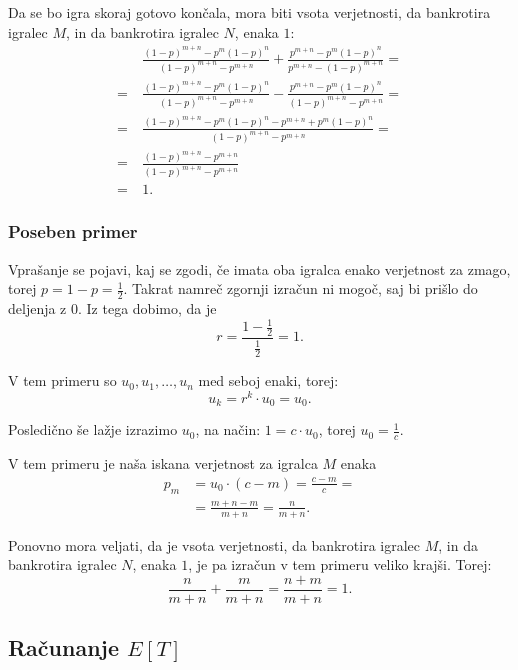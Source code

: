 \documentclass[12pt, a4paper]{article}
\begin{document}
Da se bo igra skoraj gotovo končala, mora biti vsota verjetnosti, da bankrotira igralec $M$, in da bankrotira igralec $N$, enaka $1$:
\begin{equation*}
\begin{split}
&~\frac{(1-p)^{m+n}-p^m (1-p)^n}{(1-p)^{m+n}-p^{m+n}}+\frac{p^{m+n}-p^m
   (1-p)^n}{p^{m+n}-(1-p)^{m+n}} =\\
= &~\frac{(1-p)^{m+n}-p^m (1-p)^n}{(1-p)^{m+n}-p^{m+n}}-\frac{p^{m+n}-p^m
   (1-p)^n}{(1-p)^{m+n}-p^{m+n}} =\\
= &~\frac{(1-p)^{m+n}-p^m (1-p)^n-p^{m+n}+p^m
   (1-p)^n}{(1-p)^{m+n}-p^{m+n}} =\\
= &~\frac{(1-p)^{m+n}-p^{m+n}}{(1-p)^{m+n}-p^{m+n}} \\
= &~1.
\end{split} 
\end{equation*}


\subsubsection{Poseben primer}
\label{Poseben primer za  r = 1}
Vprašanje se pojavi, kaj se zgodi, če imata oba igralca enako verjetnost za zmago, torej $p = 1 - p = \frac{1}{2}$. Takrat namreč zgornji izračun ni mogoč, saj bi prišlo do deljenja z $0$. Iz tega dobimo, da je 
$$r = \frac{1 - \frac{1}{2}}{\frac{1}{2}} = 1.$$

V tem primeru so $u_0, u_1, \dotso, u_n$ med seboj enaki, torej:
$$u_k = r^k \cdot u_0 = u_0.$$

Posledično še lažje izrazimo $u_0$, na način:
$1 = c\cdot u_0$, torej $u_0 = \frac{1}{c}.$

V tem primeru je naša iskana verjetnost za igralca $M$ enaka
\begin{equation*}
\begin{split}
p_m &= u_0 \cdot (c - m) = \frac{c-m}{c} = \\
		&= \frac{m + n - m}{m + n} = \frac{n}{m + n}.
\end{split} 
\end{equation*}

Ponovno mora veljati, da je vsota verjetnosti, da bankrotira igralec $M$, in da bankrotira igralec $N$, enaka $1$, je pa izračun v tem primeru veliko krajši. Torej: 
$$\frac{n}{m + n} + \frac{m}{m + n} = \frac{n + m}{m+ n} = 1.$$


\subsection{Računanje $E[T]$}
\end{document}
